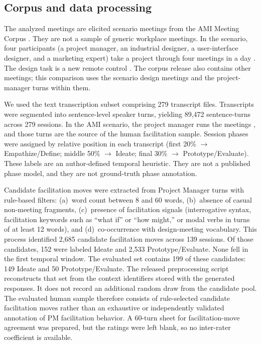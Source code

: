 \documentclass[11pt]{article}
\begin{document}
\subsection{Corpus and data processing}
The analyzed meetings are elicited scenario meetings from the AMI Meeting Corpus \citep{carletta2005ami, carletta2006elra}. They are not a sample of generic workplace meetings. In the scenario, four participants (a project manager, an industrial designer, a user-interface designer, and a marketing expert) take a project through four meetings in a day \citep{carletta2006elra}. The design task is a new remote control \citep{ami2006scenario}. The corpus release also contains other meetings; this comparison uses the scenario design meetings and the project-manager turns within them.

We used the text transcription subset comprising 279 transcript files. Transcripts were segmented into sentence-level speaker turns, yielding 89,472 sentence-turns across 279 sessions. In the AMI scenario, the project manager runs the meetings \citep{carletta2006elra}, and those turns are the source of the human facilitation sample. Session phases were assigned by relative position in each transcript (first 20\% $\rightarrow$ Empathize/Define; middle 50\% $\rightarrow$ Ideate; final 30\% $\rightarrow$ Prototype/Evaluate). These labels are an author-defined temporal heuristic. They are not a published phase model, and they are not ground-truth phase annotation.

Candidate facilitation moves were extracted from Project Manager turns with rule-based filters: (a)~word count between 8 and 60 words, (b)~absence of casual non-meeting fragments, (c)~presence of facilitation signals (interrogative syntax, facilitation keywords such as ``what if'' or ``how might,'' or modal verbs in turns of at least 12 words), and (d)~co-occurrence with design-meeting vocabulary. This process identified 2,685 candidate facilitation moves across 139 sessions. Of those candidates, 152 were labeled Ideate and 2,533 Prototype/Evaluate. None fell in the first temporal window. The evaluated set contains 199 of these candidates: 149 Ideate and 50 Prototype/Evaluate. The released preprocessing script reconstructs that set from the context identifiers stored with the generated responses. It does not record an additional random draw from the candidate pool. The evaluated human sample therefore consists of rule-selected candidate facilitation moves rather than an exhaustive or independently validated annotation of PM facilitation behavior. A 60-turn sheet for facilitation-move agreement was prepared, but the ratings were left blank, so no inter-rater coefficient is available.
\end{document}
